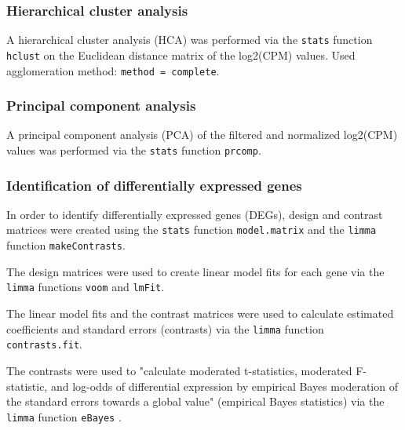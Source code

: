 \subsubsection{Hierarchical cluster analysis}\label{hierarchical-cluster-analysis}

A hierarchical cluster analysis (HCA) was performed via the \verb|stats| function \verb|hclust| on the Euclidean distance matrix of the log2(CPM) values. Used agglomeration method: \verb|method = complete|.

\subsubsection{Principal component analysis}\label{principal-component-analysis}

A principal component analysis (PCA) of the filtered and normalized log2(CPM) values was performed via the \verb|stats| function \verb|prcomp|.

\subsubsection{Identification of differentially expressed genes}\label{differentially-expressed-genes}

In order to identify differentially expressed genes (DEGs), design and contrast matrices were created using the \verb|stats| function \verb|model.matrix| and the \verb|limma| function \verb|makeContrasts|.

The design matrices were used to create linear model fits for each gene via the \verb|limma| functions \verb|voom| and \verb|lmFit|.

The linear model fits and the contrast matrices were used to calculate estimated coefficients and standard errors (contrasts) via the \verb|limma| function \verb|contrasts.fit|.

The contrasts were used to "calculate moderated t-statistics, moderated F-statistic, and log-odds of differential expression by empirical Bayes moderation of the standard errors towards a global value" (empirical Bayes statistics) via the \verb|limma| function \verb|eBayes| \autocite{R-limma}.

